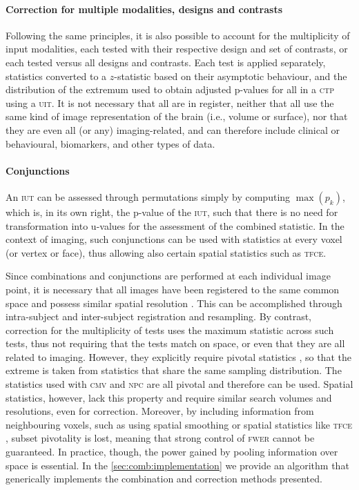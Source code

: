 \paragraph{Correction for multiple modalities, designs and contrasts} Following the same principles, it is also possible to account for the multiplicity of input modalities, each tested with their respective design and set of contrasts, or each tested versus all designs and contrasts. Each test is applied separately, statistics converted to a $z$-statistic based on their asymptotic behaviour, and the distribution of the extremum used to obtain adjusted p-values for all in a \textsc{ctp} using a \textsc{uit}. It is not necessary that all are in register, neither that all use the same kind of image representation of the brain (i.e., volume or surface), nor that they are even all (or any) imaging-related, and can therefore include clinical or behavioural, biomarkers, and other types of data.

\paragraph{Conjunctions} An \textsc{iut} can be assessed through permutations simply by computing $\max \left(p_{k}\right)$, which is, in its own right, the p-value of the \textsc{iut}, such that there is no need for transformation into u-values for the assessment of the combined statistic. In the context of imaging, such conjunctions can be used with statistics at every voxel (or vertex or face), thus allowing also certain spatial statistics such as \textsc{tfce}.

\vspace{10pt}

Since combinations and conjunctions are performed at each individual image point, it is necessary that all images have been registered to the same common space and possess similar spatial resolution \citep{Lazar2002}. This can be accomplished through intra-subject and inter-subject registration and resampling. By contrast, correction for the multiplicity of tests uses the maximum statistic across such tests, thus not requiring that the tests match on space, or even that they are all related to imaging. However, they explicitly require pivotal statistics \citep[for pivotality in this context, see][]{Winkler2014}, so that the extreme is taken from statistics that share the same sampling distribution. The statistics used with \textsc{cmv} and \textsc{npc} are all pivotal and therefore can be used. Spatial statistics, however, lack this property and require similar search volumes and resolutions, even for correction. Moreover, by including information from neighbouring voxels, such as using spatial smoothing or spatial statistics like \textsc{tfce} \citep{Smith2009}, subset pivotality is lost, meaning that strong control of \textsc{fwer} cannot be guaranteed. In practice, though, the power gained by pooling information over space is essential. In the \ref{sec:comb:implementation} we provide an algorithm that generically implements the combination and correction methods presented.

